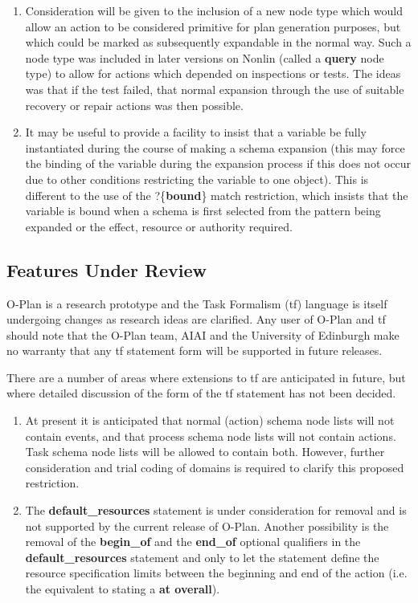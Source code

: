 \begin{enumerate}
\item Consideration will be given to the inclusion of a new node type
which would allow an action to be considered primitive for plan generation
purposes, but which could be marked as subsequently expandable in the normal
way.  Such a node type was included in later versions on Nonlin (called a {\bf
query} node type) to allow for actions which depended on inspections or tests.
The ideas was that if the test failed, that normal expansion through the use
of suitable recovery or repair actions was then possible.

\item It may be useful to provide a facility to insist that a variable
be fully instantiated during the course of making a schema expansion (this may
force the binding of the variable during the expansion process if this does
not occur due to other conditions restricting the variable to one object).
This is different to the use of the ?\{{\bf bound}\} match restriction, which
insists that the variable is bound when a schema is first selected from the
pattern being expanded or the effect, resource or authority required.

\end{enumerate}

\subsection{Features Under Review}

O-Plan is a research prototype and the Task Formalism ({\sc tf}) language
is itself undergoing changes as research ideas are clarified.  Any user
of O-Plan and {\sc tf} should note that the O-Plan team, AIAI and
the University of Edinburgh make no warranty that any {\sc tf}
statement form will be supported in future releases.

There are a number of areas where extensions to {\sc tf} are anticipated in
future, but where detailed discussion of the form of the {\sc tf} statement
has not been decided. 

\begin{enumerate}

\item At present it is anticipated that normal (action) schema
node lists will not contain events, and that process schema node
lists will not contain actions.  Task schema node lists will be
allowed to contain both.  However, further consideration and trial coding of
domains is required to clarify this proposed restriction.

\item The {\bf default\_resources} statement is under consideration
for removal and is not supported by the current release of O-Plan.  Another
possibility is the removal of the {\bf begin\_of} and the {\bf end\_of}
optional qualifiers in the {\bf default\_resources} statement and only to let
the statement define the resource specification limits between the beginning
and end of the action (i.e. the equivalent to stating a
 {\bf at overall}).

\end{enumerate}

